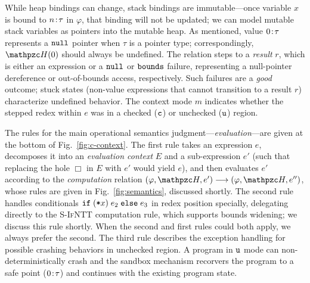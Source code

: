 While heap bindings can change, stack bindings are immutable---once
variable $x$ is bound to ${n}\!:\!{\tau}$ in $\varphi$, that binding will not
be updated; we can model mutable stack variables as pointers into the
mutable heap.
As mentioned, value ${0}\!:\!{\tau}$
represents a $\mathtt{null}$ pointer when $\tau$ is a pointer type;
correspondingly, $\heap(0)$ should always be undefined.
The relation steps to a \emph{result} $r$,
which is either an expression or a $\mathtt{null}$ or $\mathtt{bounds}$ failure,
representing a null-pointer dereference or out-of-bounds access,
respectively. Such failures are a \emph{good} outcome; stuck states
(non-value expressions that cannot transition to a result $r$)
characterize undefined behavior.
%
The context mode $m$ indicates whether the
stepped redex within $e$ was in a checked ($\texttt{c}$) or
unchecked ($\texttt{u}$) region.

The rules for the main operational semantics
judgment---\emph{evaluation}---are given at the bottom of
Fig.~\ref{fig:c-context}.
The first rule takes an expression $e$, decomposes
it into an \emph{evaluation context} $E$ and a sub-expression $e'$
(such that replacing the hole $\Box$ in $E$ with $e'$ would yield
$e$), and then evaluates $e'$ according to the \emph{computation}
  relation $(\varphi,\heap,e') \longrightarrow (\varphi,\heap,e'')$,
whose rules are given in Fig.~\ref{fig:semantics}, discussed
shortly. 
The second rule handles conditionals $\mathtt{if\;}(\texttt{*}{x})\;{e_2}\;\mathtt{else}\;{e_3}$ in
redex position specially, delegating directly to the \textsc{S-IfNTT} computation
rule, which supports bounds widening; we discuss this rule
shortly. When the second and first rules could both apply, we always prefer the second.
The third rule describes the exception handling 
for possible crashing behaviors in unchecked region.
A program in $\texttt{u}$ mode can non-deterministically crash
and the \systemname sandbox mechanism recorvers
the program to a safe point (${0}\!:\!{\tau}$)
and continues with the existing program state.

